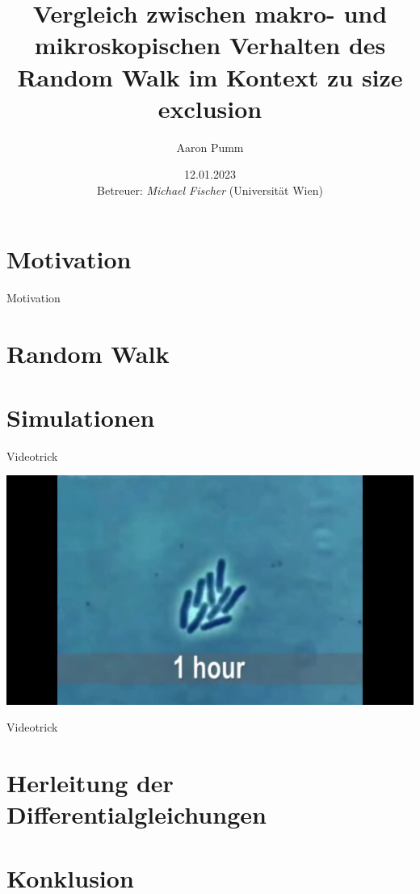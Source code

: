 \documentclass[xcolor=dvipsnames, aspectratio=169]{beamer}
\title{Vergleich zwischen makro- und mikroskopischen Verhalten des Random Walk im Kontext zu size exclusion}
\author{Aaron Pumm}
\institute{Universität Wien}
\date{12.01.2023 \\ \vspace{0.2in} \footnotesize{Betreuer: \textit{Michael Fischer} (Universität Wien)}}
\begin{document}

\begin{frame}[t]
	\titlepage
\end{frame}

\logo{}




\section{Motivation}

\begin{frame}[t]{Motivation}

\end{frame}

\section{Random Walk}
\section{Simulationen}

\begin{frame}[t]{Videotrick}
	\begin{center}
	\includegraphics[width=0.6\linewidth]{bacteria_pushing/bacteria-pushing-01.jpeg} 
	\end{center}
	\end{frame}
	
	\begin{frame}[t]{Videotrick}
	\begin{center}
	\end{center}
	\end{frame}

\section{Herleitung der Differentialgleichungen}
\section{Konklusion}
\end{document}
